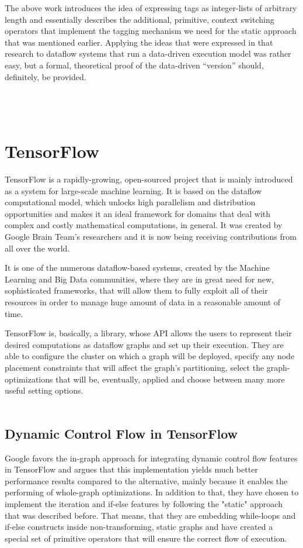 \documentclass[ack,preface]{dithesis}
\begin{document}
The above work introduces the idea of expressing tags as integer-lists of arbitrary length and essentially describes the additional, primitive, context switching operators that implement the tagging mechanism we need for the static approach that was mentioned earlier. Applying the ideas that were expressed in that research to dataflow systems that run a data-driven execution model was rather easy, but a formal, theoretical proof of the data-driven “version” should, definitely, be provided.
\\\\\\\


    \section{TensorFlow}

TensorFlow  \cite{Abadi:2016} is a rapidly-growing, open-sourced project that is mainly introduced as a system for large-scale machine learning. It is based on the dataflow computational model, which unlocks high parallelism and distribution opportunities and makes it an ideal framework for domains that deal with complex and costly mathematical computations, in general. It was created by Google Brain Team’s researchers and it is now being receiving contributions from all over the world. 

It is one of the numerous \cite{Zaharia:2012,Rossbach:2013, Theano, Jia2014caffe} dataflow-based systems, created by the Machine Learning and Big Data communities, where they are in great need for new, sophisticated frameworks, that will allow them to fully exploit all of their resources in order to manage huge amount of data in a reasonable amount of time.

TensorFlow is, basically, a library, whose API allows the users to represent their desired computations as dataflow graphs and set up their execution. 
They are able to configure the cluster on which a graph will be deployed, specify any node placement constraints that will affect the graph's partitioning, select the graph-optimizations that will be, eventually, applied and choose between many more useful setting options. \\\\

    \subsection{Dynamic Control Flow in TensorFlow}
Google favors the in-graph approach for integrating dynamic control flow features in TensorFlow and argues that this implementation yields much better performance results compared to the alternative, mainly because it enables the performing of whole-graph optimizations. In addition to that, they have chosen to implement the iteration and if-else features by following the "static" approach that was described before. That means, that they are embedding while-loops and if-else constructs inside non-transforming, static graphs and have created a special set of primitive operators that will ensure the correct flow of execution.  \cite{Yu:2018}
\end{document}
